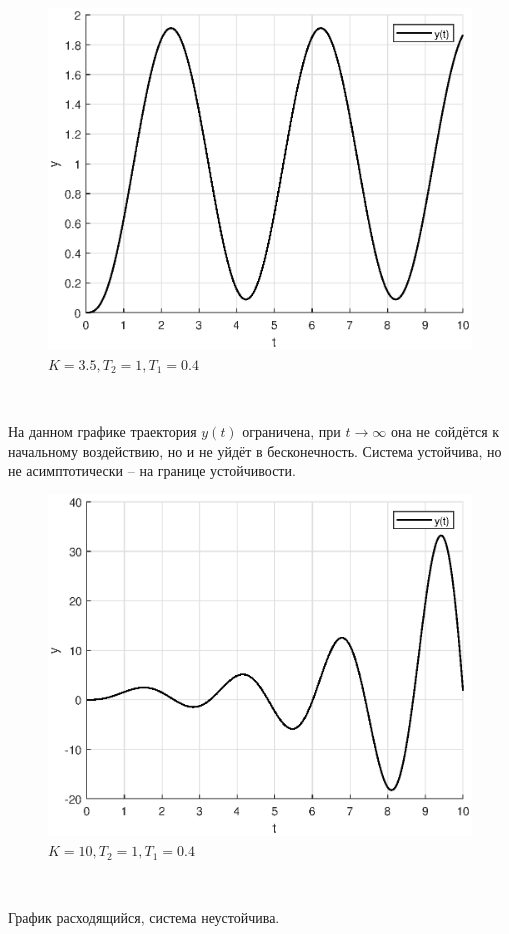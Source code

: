 \documentclass[a4paper]{article}
\begin{document}
\begin{figure}[H]
    \centering
    \includegraphics[width=0.75\linewidth]{ex2/3.5.eps}
    \caption{$K = 3.5, T_2 = 1, T_1 = 0.4$}
\end{figure}\

На данном графике траектория $y(t)$ ограничена, при $t \to \infty$ она не сойдётся к начальному воздействию, но и не уйдёт в бесконечность. Система устойчива, но не асимптотически -- на границе устойчивости.

\begin{figure}[H]
    \centering
    \includegraphics[width=0.75\linewidth]{ex2/10.eps}
    \caption{$K = 10, T_2 = 1, T_1 = 0.4$}
\end{figure}\

График расходящийся, система неустойчива.
\end{document}
